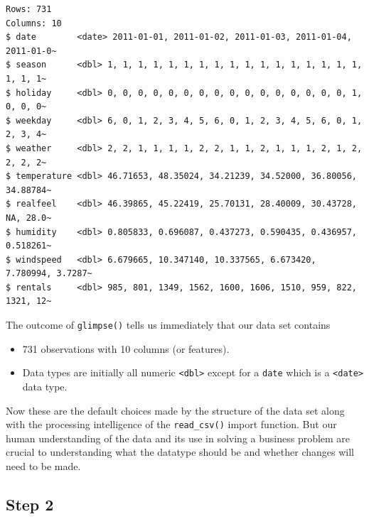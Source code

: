 \documentclass[
  letterpaper,
  DIV=11,
  numbers=noendperiod]{scrartcl}
\begin{document}
\begin{verbatim}
Rows: 731
Columns: 10
$ date        <date> 2011-01-01, 2011-01-02, 2011-01-03, 2011-01-04, 2011-01-0~
$ season      <dbl> 1, 1, 1, 1, 1, 1, 1, 1, 1, 1, 1, 1, 1, 1, 1, 1, 1, 1, 1, 1~
$ holiday     <dbl> 0, 0, 0, 0, 0, 0, 0, 0, 0, 0, 0, 0, 0, 0, 0, 0, 1, 0, 0, 0~
$ weekday     <dbl> 6, 0, 1, 2, 3, 4, 5, 6, 0, 1, 2, 3, 4, 5, 6, 0, 1, 2, 3, 4~
$ weather     <dbl> 2, 2, 1, 1, 1, 1, 2, 2, 1, 1, 2, 1, 1, 1, 2, 1, 2, 2, 2, 2~
$ temperature <dbl> 46.71653, 48.35024, 34.21239, 34.52000, 36.80056, 34.88784~
$ realfeel    <dbl> 46.39865, 45.22419, 25.70131, 28.40009, 30.43728, NA, 28.0~
$ humidity    <dbl> 0.805833, 0.696087, 0.437273, 0.590435, 0.436957, 0.518261~
$ windspeed   <dbl> 6.679665, 10.347140, 10.337565, 6.673420, 7.780994, 3.7287~
$ rentals     <dbl> 985, 801, 1349, 1562, 1600, 1606, 1510, 959, 822, 1321, 12~
\end{verbatim}

The outcome of \texttt{glimpse()} tells us immediately that our data set
contains

\begin{itemize}
\item
  731 observations with 10 columns (or features).
\item
  Data types are initially all numeric
  \texttt{\textless{}dbl\textgreater{}} except for a \texttt{date} which
  is a \texttt{\textless{}date\textgreater{}} data type.
\end{itemize}

Now these are the default choices made by the structure of the data set
along with the processing intelligence of the \texttt{read\_csv()}
import function. But our human understanding of the data and its use in
solving a business problem are crucial to understanding what the
datatype should be and whether changes will need to be made.

\hypertarget{step-2}{%
\subsection{Step 2}\label{step-2}}
\end{document}
